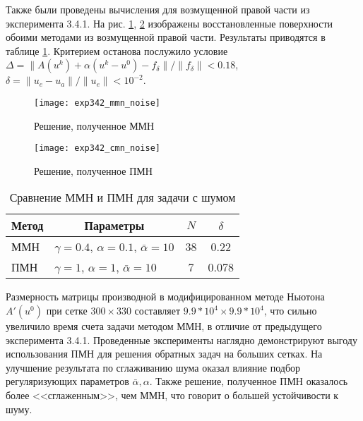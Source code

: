 Также были проведены вычисления для возмущенной правой части из эксперимента 3.4.1. На рис. \ref{fig:exp342_mmn_noise}, \ref{fig:exp342_cmn_noise} изображены восстановленные поверхности обоими методами из возмущенной правой части. Результаты приводятся в таблице \ref{table3.6}. Критерием останова послужило условие $\Delta=\|A(u^k)+\alpha(u^k-u^0)-f_\delta\|/\|f_\delta\|<0.18$, $\delta=\|u_e-u_a\|/\|u_e\|<10^{-2}$.
\begin{figure}[H]
	\centering
	\texttt{[image: exp342\_mmn\_noise]}
	\caption{Решение, полученное ММН}
	\label{fig:exp342_mmn_noise}
\end{figure}
\begin{figure}[H]
	\centering
	\texttt{[image: exp342\_cmn\_noise]}
	\caption{Решение, полученное ПМН}
	\label{fig:exp342_cmn_noise}
\end{figure}
\begin{table}[h]
	\centering
	\renewcommand{\arraystretch}{1.5}
	\caption{Сравнение ММН и ПМН для задачи с шумом}
	\label{table3.6}
	\begin{tabular}{|l|l|c|c|}
		\hline
		\multicolumn{1}{|c|}{Метод} & \multicolumn{1}{c|}{Параметры}              & $N$ & $\delta$ \\ \hline
		ММН                         & $\gamma =0.4$, $\alpha=0.1$, $\bar\alpha=10$ & 38   & 0.22     \\ \hline
		ПМН                         & $\gamma =1$, $\alpha=1$, $\bar\alpha=10$    & 7   & 0.078    \\ \hline
	\end{tabular}
\end{table}

Размерность матрицы производной в модифицированном методе Ньютона $A'(u^0)$ при сетке $300\times330$ составляет $9.9 * 10^4\times 9.9 * 10^4$, что сильно увеличило время счета задачи методом ММН, в отличие от предыдущего эксперимента 3.4.1. Проведенные эксперименты наглядно демонстрируют выгоду использования ПМН для решения обратных задач на больших сетках. На улучшение результата по сглаживанию шума оказал влияние подбор регуляризующих параметров $\bar{\alpha}, \alpha$. Также решение, полученное ПМН оказалось более <<сглаженным>>, чем ММН, что говорит о большей устойчивости к шуму.
 
